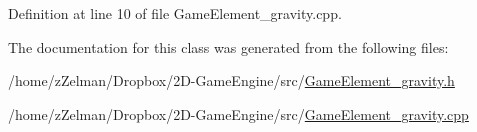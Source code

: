 Definition at line 10 of file Game\-Element\-\_\-gravity.\-cpp.



The documentation for this class was generated from the following files\-:\begin{DoxyCompactItemize}
\item 
/home/z\-Zelman/\-Dropbox/2\-D-\/\-Game\-Engine/src/\hyperlink{GameElement__gravity_8h}{Game\-Element\-\_\-gravity.\-h}\item 
/home/z\-Zelman/\-Dropbox/2\-D-\/\-Game\-Engine/src/\hyperlink{GameElement__gravity_8cpp}{Game\-Element\-\_\-gravity.\-cpp}\end{DoxyCompactItemize}
